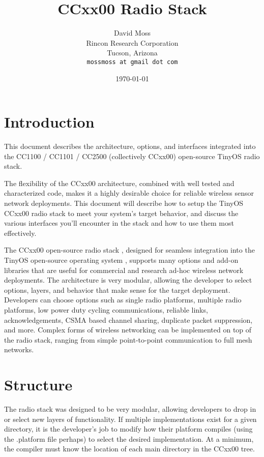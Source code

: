 \documentclass{article}
\begin{document}
\title{CCxx00 Radio Stack}
\author{David Moss\\
        Rincon Research Corporation\\
		Tucson, Arizona\\
		\texttt{mossmoss at gmail dot com}}  
\date{\today} 
\maketitle

\pagebreak
\tableofcontents
\pagebreak


\section{Introduction}
\label{sec:introduction}

This document describes the architecture, options, and interfaces integrated
into the CC1100 / CC1101 / CC2500 (collectively CCxx00) open-source TinyOS radio stack.

The flexibility of the CCxx00 architecture, combined with well tested and characterized code, makes 
it a highly desirable choice for reliable wireless sensor network deployments.  This document
will describe how to setup the TinyOS CCxx00 radio stack to meet your system's target behavior, and
discuss the various interfaces you'll encounter in the stack and how to use them most effectively.

The CCxx00 open-source radio stack \cite{opensourceccxx00}, designed for seamless integration into the TinyOS open-source
operating system \cite{tinyos}, supports many options and add-on libraries that are useful for commercial and 
research ad-hoc wireless network deployments.  The architecture is very modular, allowing the 
developer to select options, layers, and behavior that make sense for the target deployment. 
Developers can choose options such as single radio platforms, multiple radio platforms, low 
power duty cycling communications, reliable links, acknowledgements, CSMA based channel sharing, 
duplicate packet suppression, and more. Complex forms of wireless networking can be implemented on
top of the radio stack, ranging from simple point-to-point communication to full mesh networks.


\section{Structure}
\label{sec:structure}
The radio stack was designed to be very modular, allowing developers to drop in or select new
layers of functionality. If multiple implementations exist for a given directory, it 
is the developer's job to modify how their platform compiles (using the .platform file
perhaps) to select the desired implementation. At a minimum, the compiler must know the location of each main directory
in the CCxx00 tree.
\end{document}

